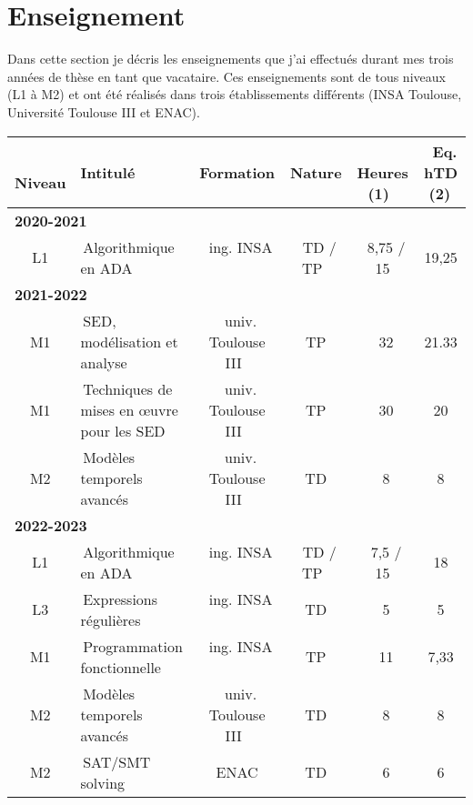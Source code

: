\label{sec:enseignements}

\vspace{10pt}
\section{Enseignement}\label{sec:tab}
\vspace{10pt}

Dans cette section je décris les enseignements que j'ai effectués durant mes trois
années de thèse en tant que vacataire. Ces enseignements sont de tous niveaux
(L1 à M2) et ont été réalisés dans trois établissements différents (INSA
Toulouse, Université Toulouse III et ENAC).\\

{\small
\begin{tabular}{c @{\quad} p{13em} @{\qquad} c c c c}
\toprule
\, Niveau  & Intitulé &Formation& Nature &   \, Heures (1) \, & \, Eq. hTD (2)\,  \\
\midrule
\multicolumn{6}{l}{\textbf{2020-2021}}\\
\, L1 \,& \,Algorithmique en ADA \,&\, ing. INSA  \,&\,  TD / TP \,&\, 8,75 / 15 & 19,25\\
\midrule
\multicolumn{6}{l}{\textbf{2021-2022}}\\
\, M1 \,& \,SED, modélisation et analyse \,&\, univ. Toulouse III  \,&\,  TP \,&\, 32 & 21.33\\
\, M1 \,& \,Techniques de mises en œuvre pour les SED\,&\, univ. Toulouse III  \,&\,  TP \,&\, 30 & 20\\
\, M2 \,& \,Modèles temporels avancés \,&\, univ. Toulouse III  \,&\,  TD \,&\, 8 & 8\\
\midrule
\multicolumn{6}{l}{\textbf{2022-2023}}\\
\, L1 \,& \,Algorithmique en ADA \,&\, ing. INSA  \,&\,  TD / TP \,&\, 7,5 / 15 & 18\\
\, L3 \,& \,Expressions régulières \,&\, ing. INSA  \,&\,  TD \,&\, 5 & 5\\
\, M1 \,& \,Programmation fonctionnelle \,&\, ing. INSA  \,&\,  TP \,&\, 11 & 7,33\\
\, M2 \,& \,Modèles temporels avancés \,&\, univ. Toulouse III  \,&\,  TD \,&\, 8 & 8\\
\, M2 \,& \,SAT/SMT solving \,&\, ENAC \,&\,  TD \,&\, 6& 6\\
\bottomrule
\end{tabular}
}
\medbreak


